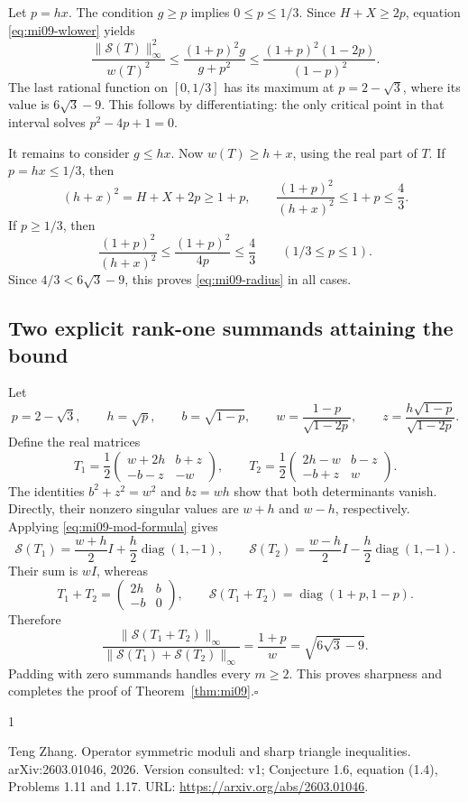 \documentclass[10pt,a4paper]{article}
\theoremstyle{remark}
\newcommand{\diag}{\operatorname{diag}}
\newcommand{\opnorm}[1]{\lVert #1\rVert_{\infty}}
\newcommand{\symmod}{\mathcal S}
\begin{document}
Let $p=hx$. The condition $g\geq p$ implies $0\leq p\leq1/3$. Since $H+X\geq2p$, equation \eqref{eq:mi09-wlower} yields
\[
 \frac{\opnorm{\symmod(T)}^2}{w(T)^2}
 \leq \frac{(1+p)^2g}{g+p^2}
 \leq\frac{(1+p)^2(1-2p)}{(1-p)^2}.
\]
The last rational function on $[0,1/3]$ has its maximum at $p=2-\sqrt3$, where its value is $6\sqrt3-9$. This follows by differentiating: the only critical point in that interval solves $p^2-4p+1=0$.

It remains to consider $g\leq hx$. Now $w(T)\geq h+x$, using the real part of $T$. If $p=hx\leq1/3$, then
\[
 (h+x)^2=H+X+2p\geq1+p,
 \qquad\frac{(1+p)^2}{(h+x)^2}\leq1+p\leq\frac43.
\]
If $p\geq1/3$, then
\[
 \frac{(1+p)^2}{(h+x)^2}\leq\frac{(1+p)^2}{4p}\leq\frac43
 \qquad(1/3\leq p\leq1).
\]
Since $4/3<6\sqrt3-9$, this proves \eqref{eq:mi09-radius} in all cases.

\subsection{Two explicit rank-one summands attaining the bound}
Let
\[
 p=2-\sqrt3,\qquad h=\sqrt p,\qquad b=\sqrt{1-p},\qquad
 w=\frac{1-p}{\sqrt{1-2p}},\qquad z=\frac{h\sqrt{1-p}}{\sqrt{1-2p}}.
\]
Define the real matrices
\[
 T_1=\frac12\begin{pmatrix}w+2h&b+z\\-b-z&-w\end{pmatrix},\qquad
 T_2=\frac12\begin{pmatrix}2h-w&b-z\\-b+z&w\end{pmatrix}.
\]
The identities $b^2+z^2=w^2$ and $bz=wh$ show that both determinants vanish. Directly, their nonzero singular values are $w+h$ and $w-h$, respectively. Applying \eqref{eq:mi09-mod-formula} gives
\[
 \symmod(T_1)=\frac{w+h}{2}I+\frac h2\diag(1,-1),\qquad
 \symmod(T_2)=\frac{w-h}{2}I-\frac h2\diag(1,-1).
\]
Their sum is $wI$, whereas
\[
 T_1+T_2=\begin{pmatrix}2h&b\\-b&0\end{pmatrix},\qquad
 \symmod(T_1+T_2)=\diag(1+p,1-p).
\]
Therefore
\[
 \frac{\opnorm{\symmod(T_1+T_2)}}{\opnorm{\symmod(T_1)+\symmod(T_2)}}
 =\frac{1+p}{w}=\sqrt{6\sqrt3-9}.
\]
Padding with zero summands handles every $m\geq2$. This proves sharpness and completes the proof of Theorem~\ref{thm:mi09}.\hfill$\square$

\begin{thebibliography}{1}

Teng Zhang.
\newblock Operator symmetric moduli and sharp triangle inequalities.
\newblock arXiv:2603.01046, 2026.
\newblock Version consulted: v1; Conjecture 1.6, equation (1.4), Problems 1.11
  and 1.17.
\newblock URL: \url{https://arxiv.org/abs/2603.01046}.

\end{thebibliography}
\end{document}
